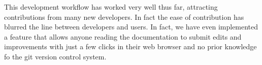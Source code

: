 \documentclass[11pt,twoside]{article}
\begin{document}
This development workflow has worked very well thus far, attracting
contributions from many new developers.  In fact the ease of contribution has
blurred the line between developers and users.  In fact, we have even
implemented a feature that allows anyone reading the documentation to submit
edits and improvements with just a few clicks in their web browser and no
prior knowledge fo the git version control system.


% 
% 
% 
% 
% 
% 


\end{document}

